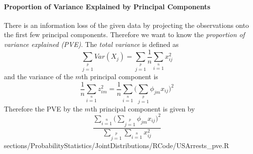 {	\paragraph{Proportion of Variance Explained by Principal Components}
	\RTheory
	{
	There is an information loss of the given data by projecting the observations onto the first few principal components. Therefore we want to know the \textit{proportion of variance explained (PVE)}. The \textit{total variance} is defined as
	$$
	\sum\limits_{j=1}\limits^{p} Var(X_j)=\sum\limits_{j=1}\limits^{p}\frac{1}{n}\sum\limits_{i=1}\limits^{n}x_{ij}^2
	$$	
	and the variance of the $m$th principal component is
	$$
	\frac{1}{n}\sum\limits_{i=1}\limits^{n}z_{im}^2=\frac{1}{n}\sum\limits_{i=1}\limits^{n}\bigg(\sum\limits_{j=1}\limits^{p}\phi_{jm}x_{ij}\bigg)^2
	$$
	Therefore the PVE by the $m$th principal component is given by
	$$
\frac{\sum\limits_{i=1}\limits^{n}\bigg(\sum\limits_{j=1}\limits^{p}\phi_{jm}x_{ij}\bigg)^2}{\sum\limits_{j=1}\limits^{p}\sum\limits_{i=1}\limits^{n}x_{ij}^2}
	$$
	}
	{sections/ProbabilityStatistics/JointDistributions/RCode/USArrests_pve.R}

	


}
